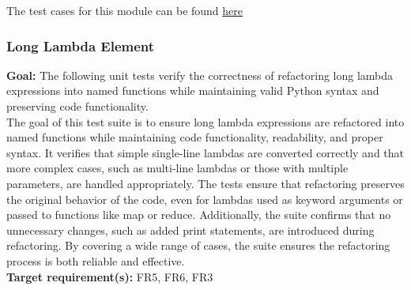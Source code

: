\documentclass[12pt, titlepage]{article}
\begin{document}
  \noindent The test cases for this module can be found
  \href{https://github.com/ssm-lab/capstone--source-code-optimizer/blob/main/tests/refactorers/test_long_element_chain.py}{here}

  \subsubsection{Long Lambda Element}

  \textbf{Goal:} The following unit tests verify the correctness of
  refactoring long lambda expressions into named functions while
  maintaining valid Python syntax and preserving code functionality.\\

  \noindent The goal of this test suite is to ensure long lambda
  expressions are refactored into named
  functions while maintaining code functionality, readability, and
  proper syntax. It verifies
  that simple single-line lambdas are converted correctly and that
  more complex cases, such as
  multi-line lambdas or those with multiple parameters, are handled
  appropriately. The tests
  ensure that refactoring preserves the original behavior of the
  code, even for lambdas used
  as keyword arguments or passed to functions like map or reduce.
  Additionally, the suite
  confirms that no unnecessary changes, such as added print
  statements, are introduced during
  refactoring. By covering a wide range of cases, the suite ensures
  the refactoring process
  is both reliable and effective.\\

  \noindent \textbf{Target requirement(s):} FR5, FR6, FR3 ~\cite{SRS} \\
\end{document}
